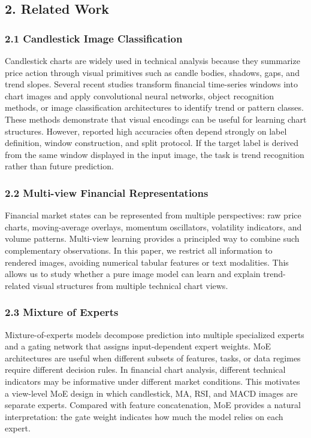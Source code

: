 \documentclass[
]{article}
\begin{document}
\subsection{2. Related Work}\label{related-work}

\subsubsection{2.1 Candlestick Image
Classification}\label{candlestick-image-classification}

Candlestick charts are widely used in technical analysis because they
summarize price action through visual primitives such as candle bodies,
shadows, gaps, and trend slopes. Several recent studies transform
financial time-series windows into chart images and apply convolutional
neural networks, object recognition methods, or image classification
architectures to identify trend or pattern classes. These methods
demonstrate that visual encodings can be useful for learning chart
structures. However, reported high accuracies often depend strongly on
label definition, window construction, and split protocol. If the target
label is derived from the same window displayed in the input image, the
task is trend recognition rather than future prediction.

\subsubsection{2.2 Multi-view Financial
Representations}\label{multi-view-financial-representations}

Financial market states can be represented from multiple perspectives:
raw price charts, moving-average overlays, momentum oscillators,
volatility indicators, and volume patterns. Multi-view learning provides
a principled way to combine such complementary observations. In this
paper, we restrict all information to rendered images, avoiding
numerical tabular features or text modalities. This allows us to study
whether a pure image model can learn and explain trend-related visual
structures from multiple technical chart views.

\subsubsection{2.3 Mixture of Experts}\label{mixture-of-experts}

Mixture-of-experts models decompose prediction into multiple specialized
experts and a gating network that assigns input-dependent expert
weights. MoE architectures are useful when different subsets of
features, tasks, or data regimes require different decision rules. In
financial chart analysis, different technical indicators may be
informative under different market conditions. This motivates a
view-level MoE design in which candlestick, MA, RSI, and MACD images are
separate experts. Compared with feature concatenation, MoE provides a
natural interpretation: the gate weight indicates how much the model
relies on each expert.
\end{document}
